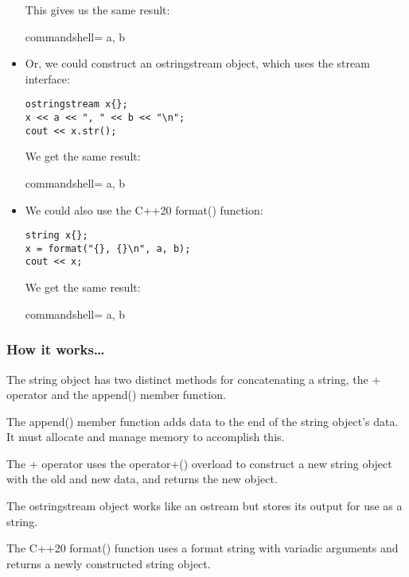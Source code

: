 \begin{itemize}
This gives us the same result:

\begin{tcblisting}{commandshell={}}
a, b
\end{tcblisting}

\item 
Or, we could construct an ostringstream object, which uses the stream interface:

\begin{lstlisting}[style=styleCXX]
ostringstream x{};
x << a << ", " << b << "\n";
cout << x.str();
\end{lstlisting}

We get the same result:

\begin{tcblisting}{commandshell={}}
a, b
\end{tcblisting}

\item 
We could also use the C++20 format() function:

\begin{lstlisting}[style=styleCXX]
string x{};
x = format("{}, {}\n", a, b);
cout << x;
\end{lstlisting}

We get the same result:

\begin{tcblisting}{commandshell={}}
a, b
\end{tcblisting}

\end{itemize}

\subsubsection{How it works…}

The string object has two distinct methods for concatenating a string, the + operator and the append() member function.

The append() member function adds data to the end of the string object's data. It must allocate and manage memory to accomplish this.

The + operator uses the operator+() overload to construct a new string object with the old and new data, and returns the new object.

The ostringstream object works like an ostream but stores its output for use as a string.

The C++20 format() function uses a format string with variadic arguments and returns a newly constructed string object.

